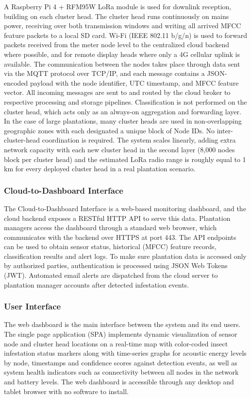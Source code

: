 \documentclass[12pt,a4paper,oneside]{memoir}
\begin{document}
A Raspberry Pi 4 + RFM95W LoRa module is used for downlink reception, building on each cluster head. The cluster head runs continuously on mains power, receiving over both transmission windows and writing all arrived MFCC feature packets to a local SD card. Wi-Fi (IEEE 802.11 b/g/n) is used to forward packets received from the meter node level to the centralized cloud backend where possible, and for remote display heads where only a 4G cellular uplink is available. The communication between the nodes takes place through data sent via the MQTT protocol over TCP/IP, and each message contains a JSON-encoded payload with the node identifier, UTC timestamp, and MFCC feature vector. All incoming messages are sent to and routed by the cloud broker to respective processing and storage pipelines. Classification is not performed on the cluster head, which acts only as an always-on aggregation and forwarding layer. In the case of large plantations, many cluster heads are used in non-overlapping geographic zones with each designated a unique block of Node IDs. No inter-cluster-head coordination is required. The system scales linearly, adding extra network capacity with each new cluster head in the second layer (8,000 nodes block per cluster head) and the estimated LoRa radio range is roughly equal to 1 km for every deployed cluster head in a real plantation scenario.
 
\subsubsection*{Cloud-to-Dashboard Interface}
 
The Cloud-to-Dashboard Interface is a web-based monitoring dashboard, and the cloud backend exposes a RESTful HTTP API to serve this data. Plantation managers access the dashboard through a standard web browser, which communicates with the backend over HTTPS at port 443. The API endpoints can be used to obtain sensor status, historical (MFCC) feature records, classification results and alert logs. To make sure plantation data is accessed only by authorized parties, authentication is processed using JSON Web Tokens (JWT). Automated email alerts are dispatched from the cloud server to plantation manager accounts after detected infestation events.
 
\subsubsection*{User Interface}
 
The web dashboard is the main interface between the system and its end users. The single page application (SPA) implements dynamic visualization of sensor node and cluster head locations on a real-time map with color-coded insect infestation status markers along with time-series graphs for acoustic energy levels by node, timestamps and confidence scores against detection events, as well as system health indicators such as connectivity between all nodes in the network and battery levels. The web dashboard is accessible through any desktop and tablet browser with no software to install.
 
\end{document}
